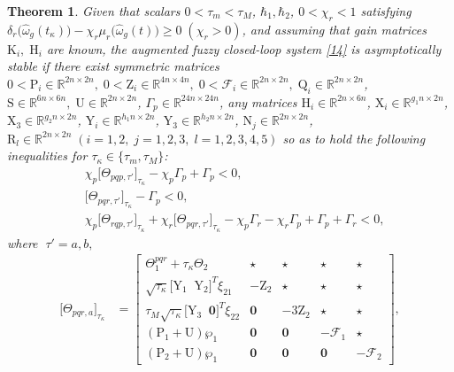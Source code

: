 \documentclass[preprint,11pt]{elsarticle}
\newtheorem{Thm}{Theorem}
\begin{document}
\begin{Thm}\label{Thm12}
Given that scalars $0<\tau_m<\tau_M$, $\hbar_1,\hbar_2$, {$0<\chi_r< 1$} satisfying {$\delta_r\big(\hat{\omega}_g(t_\kappa)\big)-{\chi}_r\mu_r\big(\hat{\omega}_g(t)\big)\geq 0\;(\chi_r>0)$,} and assuming that gain matrices $\mathrm{K}_i,\;\mathrm{H}_i$ are known, the augmented fuzzy closed-loop system \eqref{14} is asymptotically stable if there exist symmetric matrices $0<\mathrm{P}_i\in  \mathbb{R}^{2n\times 2n},\; 0<\mathrm{Z}_i\in  \mathbb{R}^{4n\times4n}, \; 0<{\mathcal{F}_i}\in  \mathbb{R}^{2n\times 2n},\;\mathrm{Q}_i\in  \mathbb{R}^{2n\times 2n}$, $\mathrm{S}\in  \mathbb{R}^{6n\times 6n},\;\mathrm{U}\in  \mathbb{R}^{2n\times 2n}$, $\Gamma_p\in  \mathbb{R}^{24n\times 24n}$, any matrices $ \mathrm{H}_i\in  \mathbb{R}^{2n\times 6n}$,
$ \mathrm{X}_i\in  \mathbb{R}^{g_1n\times 2n}$, $ \mathrm{X}_3\in  \mathbb{R}^{g_2n\times 2n}$,
$ \mathrm{Y}_i\in  \mathbb{R}^{h_1n\times 2n}$, $ \mathrm{Y}_3\in  \mathbb{R}^{h_2n\times 2n}$, $ \mathrm{N}_j\in  \mathbb{R}^{2n\times 2n}$,
$\mathrm{R}_l\in  \mathbb{R}^{2n\times 2n}\;(i=1,2,\;j=1,2,3,\;l=1,2,3,4,5)$ so as to hold the following inequalities for $\tau_\kappa\in\{ \tau_m,\tau_M \}$:
\begin{align}
&{\chi}_p\big[ \Theta_{pqp,\tau'}\big]_{\tau_\kappa} -{\chi}_p\Gamma_p+ \Gamma_p<0,\label{23}\\
& \big[ \Theta_{pqr,\tau'}\big]_{\tau_\kappa} - \Gamma_p<0,\label{24}\\
&{\chi}_p\big[ \Theta_{rqp,\tau'}\big]_{\tau_\kappa}+{\chi}_r\big[\Theta_{pqr,\tau'}\big]_{\tau_\kappa}
 - {\chi}_p\Gamma_r- {\chi}_r\Gamma_p+\Gamma_p+\Gamma_r<0,\label{28}
\end{align}
where $\;\tau'=a,b,$
\begin{align*}
\big[ \Theta_{pqr,a}\big]_{\tau_\kappa}&=
 \begin{bmatrix}
 \Theta_1^{pqr}+\tau_\kappa\Theta_2& \star&\star&\star&\star\\
 \sqrt{\tau_\kappa}\big[ \mathrm{Y}_1\;\;\mathrm{Y}_2 \big]^T\xi_{21}&-\mathrm{Z}_2&\star&\star&\star\\
 \tau_M \sqrt{\tau_\kappa}\big[ \mathrm{Y}_3\;\;\mathbf{0} \big]^T\xi_{22}&\mathbf{0}&-3\mathrm{Z}_2&\star&\star\\
 (\mathrm{P}_1+\mathrm{U})\wp_1&\mathbf{0}&\mathbf{0}&-{\mathcal{F}}_1&\star\\
 (\mathrm{P}_2+\mathrm{U})\wp_1&\mathbf{0}&\mathbf{0}&\mathbf{0}&-{\mathcal{F}}_2
 \end{bmatrix},\\

\end{align*}
\end{Thm}
\end{document}
